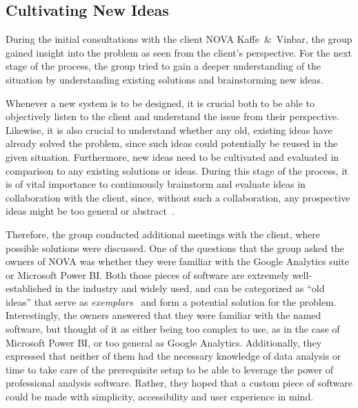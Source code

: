 \subsection{Cultivating New Ideas}\label{subsec:cultivating-new-ideas}

During the initial consultations with the client NOVA Kaffe~\&~Vinbar, the group gained insight into the problem as seen
from the client's perspective.
For the next stage of the process, the group tried to gain a deeper understanding of the situation by
understanding existing solutions and brainstorming new ideas.

Whenever a new system is to be designed, it is crucial both to be able to objectively listen to the client and
understand the issue from their perspective.
Likewise, it is also crucial to understand whether any old, existing ideas have already solved the problem, since such
ideas could potentially be reused in the given situation.
Furthermore, new ideas need to be cultivated and evaluated in comparison to any existing solutions or ideas.
During this stage of the process, it is of vital importance to continuously brainstorm and evaluate ideas in
collaboration with the client, since, without such a collaboration, any prospective ideas might be too general or
abstract~\cite[32]{mathiassen2018}.

Therefore, the group conducted additional meetings with the client, where possible solutions were discussed.
One of the questions that the group asked the owners of NOVA was whether they were familiar with the Google Analytics
suite or Microsoft Power BI\@.
Both those pieces of software are extremely well-established in the industry and widely used, and can be categorized as
``old ideas'' that serve as \textit{exemplars}~\cite[33]{mathiassen2018} and form a potential solution for the problem.
Interestingly, the owners answered that they were familiar with the named software, but thought of it as either being
too complex to use, as in the case of Microsoft Power BI, or too general as Google Analytics.
Additionally, they expressed that neither of them had the necessary knowledge of data analysis or time to take care of
the prerequisite setup to be able to leverage the power of professional analysis software.
Rather, they hoped that a custom piece of software could be made with simplicity, accessibility and user experience in
mind.

